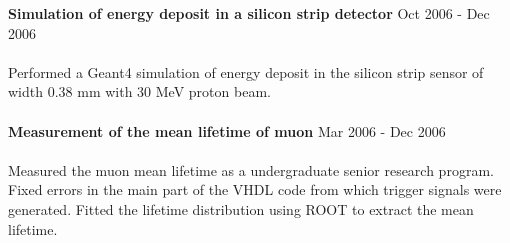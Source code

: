 \documentclass[margin]{res}
\begin{document}
\begin{resume}
\textbf{Simulation of energy deposit in a silicon strip detector}  
      \hfill Oct 2006 - Dec 2006
      \\
      \\
       Performed a Geant4 simulation of energy deposit in the silicon strip sensor of 
       width 0.38 mm with 30 MeV proton beam.  
      \\
      \\
\textbf{Measurement of the mean lifetime of muon}  
      \hfill Mar 2006 - Dec 2006
      \\
      \\
      Measured the muon mean lifetime as a undergraduate senior research program.
      Fixed errors in the main part of the VHDL code from which trigger signals were generated. 
      Fitted the lifetime distribution using ROOT to extract the mean lifetime. 




\end{resume} 
\end{document}

